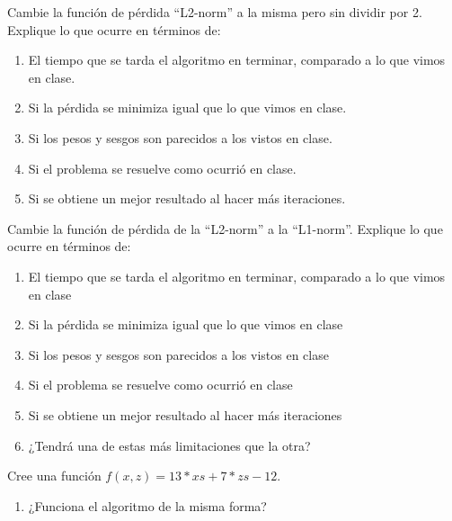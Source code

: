 \begin{problema}
	Cambie la función de pérdida “L2-norm” a la misma pero sin dividir por 2.  Explique lo que ocurre en términos de:
	\begin{enumerate}
		\item El tiempo que se tarda el algoritmo en terminar, comparado a lo que vimos en clase.
		\item Si la pérdida se minimiza igual que lo que vimos en clase.
		\item Si los pesos y sesgos son parecidos a los vistos en clase.
		\item Si el problema se resuelve como ocurrió en clase.
		\item Si se obtiene un mejor resultado al hacer más iteraciones.
	\end{enumerate}
\end{problema}

\begin{problema}
	Cambie la función de pérdida de la “L2-norm” a la “L1-norm”.  Explique lo que ocurre en términos de:
	
	\begin{enumerate}
		\item El tiempo que se tarda el algoritmo en terminar, comparado a lo que vimos en clase
		\item Si la pérdida se minimiza igual que lo que vimos en clase
		\item Si los pesos y sesgos son parecidos a los vistos en clase
		\item Si el problema se resuelve como ocurrió en clase
		 \item Si se obtiene un mejor resultado al hacer más iteraciones
		 \item  ¿Tendrá una de estas más limitaciones que la otra? 
	\end{enumerate}
\end{problema}

\begin{problema}
	Cree una función $f(x,z) = 13 * xs + 7 * zs  - 12$. 
	\begin{enumerate}
		\item ¿Funciona el algoritmo de la misma forma?
	\end{enumerate}
	
\end{problema}





